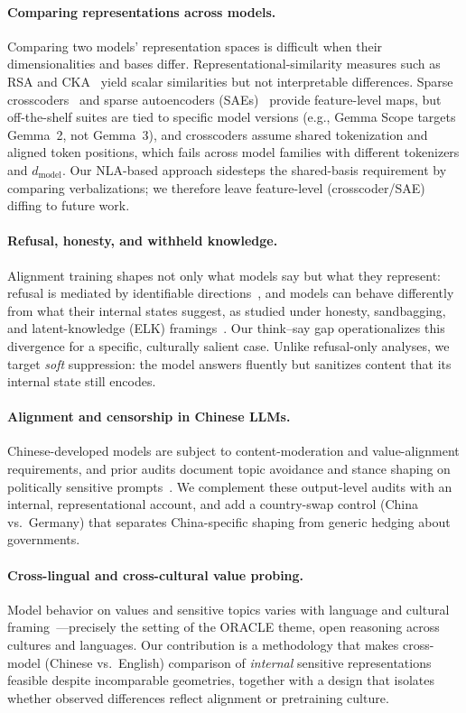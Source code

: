 \documentclass[11pt]{article}
\begin{document}
\paragraph{Comparing representations across models.}
Comparing two models' representation spaces is difficult when their
dimensionalities and bases differ. Representational-similarity measures such
as RSA and CKA~\citep{cka} yield scalar similarities but not interpretable
differences. Sparse crosscoders~\citep{crosscoder2025} and sparse
autoencoders (SAEs)~\citep{gemmascope, monosemantic} provide feature-level
maps, but off-the-shelf suites are tied to specific model versions (e.g.,
Gemma Scope targets Gemma~2, not Gemma~3), and crosscoders assume shared
tokenization and aligned token positions, which fails across model families
with different tokenizers and $d_{\text{model}}$. Our NLA-based approach
sidesteps the shared-basis requirement by comparing verbalizations; we
therefore leave feature-level (crosscoder/SAE) diffing to future work.

\paragraph{Refusal, honesty, and withheld knowledge.}
Alignment training shapes not only what models say but what they represent:
refusal is mediated by identifiable directions~\citep{refusal-direction}, and
models can behave differently from what their internal states suggest, as
studied under honesty, sandbagging, and latent-knowledge (ELK)
framings~\citep{sleeper, elk}. Our think--say gap operationalizes this
divergence for a specific, culturally salient case. Unlike refusal-only
analyses, we target \emph{soft} suppression: the model answers fluently but
sanitizes content that its internal state still encodes.

\paragraph{Alignment and censorship in Chinese LLMs.}
Chinese-developed models are subject to content-moderation and value-alignment
requirements, and prior audits document topic avoidance and stance shaping on
politically sensitive prompts~\citep{chinese-censorship}. We complement these
output-level audits with an internal, representational account, and add a
country-swap control (China vs.\ Germany) that separates China-specific
shaping from generic hedging about governments.

\paragraph{Cross-lingual and cross-cultural value probing.}
Model behavior on values and sensitive topics varies with language and
cultural framing~\citep{cultural-llm}---precisely the setting of the ORACLE
theme, open reasoning across cultures and languages. Our contribution is a
methodology that makes cross-model (Chinese vs.\ English) comparison of
\emph{internal} sensitive representations feasible despite incomparable
geometries, together with a design that isolates whether observed differences
reflect alignment or pretraining culture.
\end{document}
